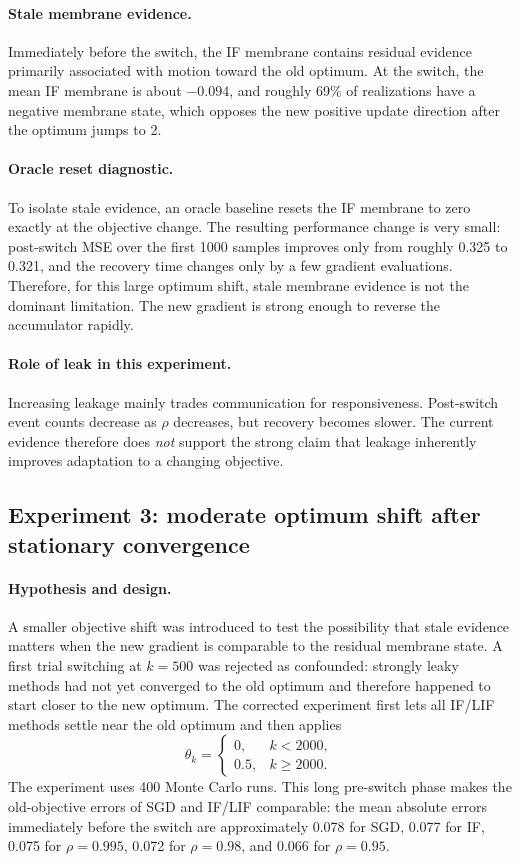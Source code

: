 \paragraph{Stale membrane evidence.}
Immediately before the switch, the IF membrane contains residual evidence primarily associated with motion toward the old optimum. At the switch, the mean IF membrane is about $-0.094$, and roughly 69\% of realizations have a negative membrane state, which opposes the new positive update direction after the optimum jumps to 2.

\paragraph{Oracle reset diagnostic.}
To isolate stale evidence, an oracle baseline resets the IF membrane to zero exactly at the objective change. The resulting performance change is very small: post-switch MSE over the first 1000 samples improves only from roughly 0.325 to 0.321, and the recovery time changes only by a few gradient evaluations. Therefore, for this large optimum shift, stale membrane evidence is not the dominant limitation. The new gradient is strong enough to reverse the accumulator rapidly.

\paragraph{Role of leak in this experiment.}
Increasing leakage mainly trades communication for responsiveness. Post-switch event counts decrease as $\rho$ decreases, but recovery becomes slower. The current evidence therefore does \emph{not} support the strong claim that leakage inherently improves adaptation to a changing objective.

\subsection{Experiment 3: moderate optimum shift after stationary convergence}

\paragraph{Hypothesis and design.}
A smaller objective shift was introduced to test the possibility that stale evidence matters when the new gradient is comparable to the residual membrane state. A first trial switching at $k=500$ was rejected as confounded: strongly leaky methods had not yet converged to the old optimum and therefore happened to start closer to the new optimum. The corrected experiment first lets all IF/LIF methods settle near the old optimum and then applies
\begin{equation}
  \theta_k=\begin{cases}
  0,&k<2000,\\
  0.5,&k\geq2000.
  \end{cases}
\end{equation}
The experiment uses 400 Monte Carlo runs. This long pre-switch phase makes the old-objective errors of SGD and IF/LIF comparable: the mean absolute errors immediately before the switch are approximately 0.078 for SGD, 0.077 for IF, 0.075 for $\rho=0.995$, 0.072 for $\rho=0.98$, and 0.066 for $\rho=0.95$.

